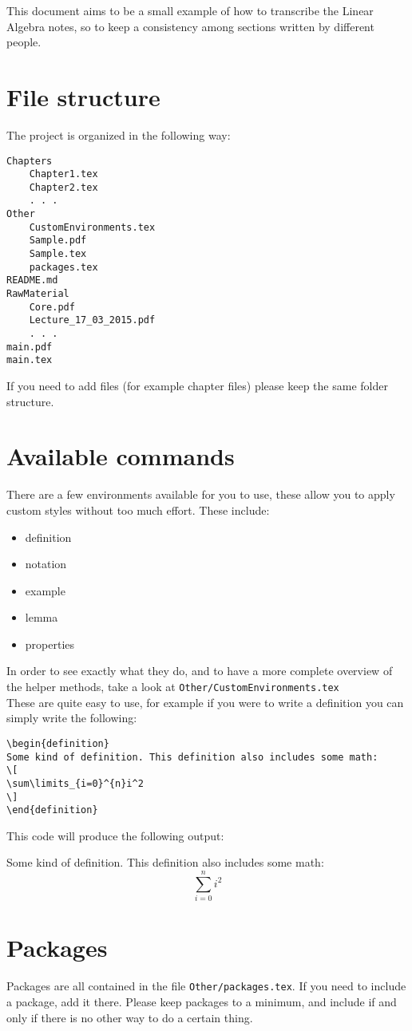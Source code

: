 \documentclass[a4paper]{article}
\begin{document}
This document aims to be a small example of how to transcribe the Linear Algebra notes, so to keep a consistency among sections written by different people.

\section{File structure}
The project is organized in the following way:
\begin{Verbatim}[obeytabs,tabsize=4]
Chapters
	Chapter1.tex
	Chapter2.tex
	. . .
Other
	CustomEnvironments.tex
	Sample.pdf
	Sample.tex
	packages.tex
README.md
RawMaterial
	Core.pdf
	Lecture_17_03_2015.pdf
	. . .
main.pdf
main.tex
\end{Verbatim}

If you need to add files (for example chapter files) please keep the same folder structure. 
\section{Available commands}
There are a few environments available for you to use, these allow you to apply custom styles without too much effort. These include:
\begin{itemize}
	\item definition
\item notation
\item example
\item lemma
\item properties
\end{itemize}
In order to see exactly what they do, and to have a more complete overview of the helper methods, take a look at \verb+Other/CustomEnvironments.tex+\\

These are quite easy to use, for example if you were to write a definition you can simply write the following:
\begin{verbatim}
\begin{definition}
Some kind of definition. This definition also includes some math:
\[
\sum\limits_{i=0}^{n}i^2
\]	
\end{definition}
\end{verbatim}
This code will produce the following output:
\begin{definition}
Some kind of definition. This definition also includes some math:
\[
\sum\limits_{i=0}^{n}i^2
\]	
\end{definition}
\section{Packages}
Packages are all contained in the file \verb+Other/packages.tex+. If you need to include a package, add it there. Please keep packages to a minimum, and include if and only if there is no other way to do a certain thing.
\end{document}
